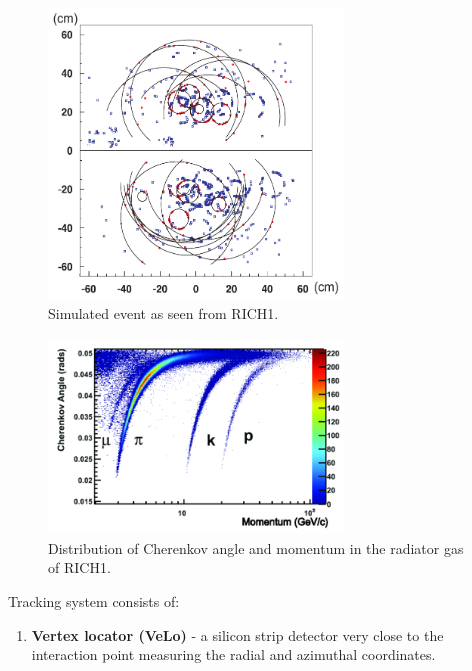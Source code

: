 \documentclass[11pt,a4paper,twoside]{article}
\begin{document}
\begin{enumerate}
\begin{figure}[H]
            \includegraphics[width=0.7\textwidth]{visuals/007-cherenkov-simulated-RICH1.png}
            
            \caption{Simulated event as seen from RICH1\cite{Bursche:2014ltl}.}
            \label{fig:007-RICH1-simulation}
        \end{figure}

        \begin{figure}[H]
            \centering

            \includegraphics[width=0.7\textwidth]{visuals/008-cherenkov-angle-distribution.png}
            
            \caption{Distribution of Cherenkov angle and momentum in the  radiator gas of RICH1\cite{Bursche:2014ltl}.}
            \label{fig:007-RICH1-simulation}
        \end{figure}



        Tracking system consists of:
        \begin{enumerate}
            \item \textbf{Vertex locator (VeLo)} - a silicon strip detector very close to the interaction point measuring the radial and azimuthal coordinates.


\end{enumerate}
\end{enumerate}
\end{document}
